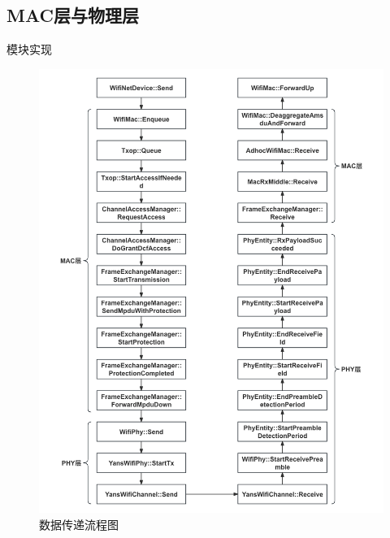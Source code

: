 \documentclass{beamer}
\begin{document}
\subsection{MAC层与物理层}
\begin{frame}{模块实现}
	\begin{figure}[h]
		\centering
		\includegraphics[height=0.8\textheight]{pic/数据流.png}
		\caption{数据传递流程图}
	\end{figure}
\end{frame}
\end{document}

